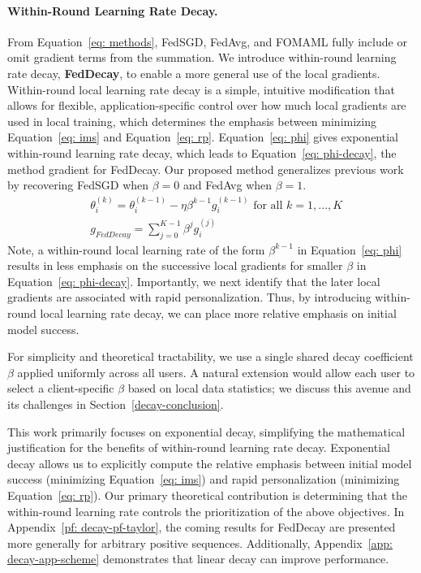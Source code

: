 \paragraph{Within-Round Learning Rate Decay.}
From Equation~\ref{eq: methods}, FedSGD, FedAvg, and FOMAML fully include or omit gradient terms from the summation.
We introduce within-round learning rate decay, {\bf FedDecay}, to enable a more general use of the local gradients.
Within-round local learning rate decay is a simple, intuitive modification that allows for flexible, application-specific control over how much local gradients are used in local training, which determines the emphasis between minimizing Equation~\ref{eq: ims} and Equation~\ref{eq: rp}.
Equation~\ref{eq: phi} gives exponential within-round learning rate decay, which leads to Equation~\ref{eq: phi-decay}, the method gradient for FedDecay. 
Our proposed method generalizes previous work by recovering FedSGD when $\beta = 0$ and FedAvg when $\beta = 1$.
\begin{align}
    & \theta_i^{(k)} = \theta_i^{(k - 1)} - \eta \beta^{k - 1} g_i^{(k - 1)} \textrm{ for all } k = 1, \ldots, K \label{eq: phi} \\
    & g_{FedDecay} = \sum_{j = 0}^{K - 1} \beta^j g_i^{(j)} \label{eq: phi-decay}
\end{align}
Note, a within-round local learning rate of the form $\beta^{k - 1}$ in Equation~\ref{eq: phi} results in less emphasis on the successive local gradients for smaller $\beta$ in Equation~\ref{eq: phi-decay}.
Importantly, we next identify that the later local gradients are associated with rapid personalization.
Thus, by introducing within-round local learning rate decay, we can place more relative emphasis on initial model success.

For simplicity and theoretical tractability, we use a single shared decay coefficient $\beta$ applied uniformly across all users.
A natural extension would allow each user to select a client-specific $\beta$ based on local data statistics; we discuss this avenue and its challenges in Section~\ref{decay-conclusion}.

This work primarily focuses on exponential decay, simplifying the mathematical justification for the benefits of within-round learning rate decay.
Exponential decay allows us to explicitly compute the relative emphasis between initial model success (minimizing Equation~\ref{eq: ims}) and rapid personalization (minimizing Equation~\ref{eq: rp}).
Our primary theoretical contribution is determining that the within-round learning rate controls the prioritization of the above objectives.
In Appendix~\ref{pf: decay-pf-taylor}, the coming results for FedDecay are presented more generally for arbitrary positive sequences. Additionally, Appendix~\ref{app: decay-app-scheme} demonstrates that linear decay can improve performance. 


